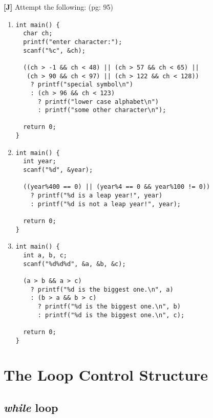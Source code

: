 \documentclass{report}
\begin{document}
\textbf{[J]} Attempt the following: (pg: 95)
\begin{enumerate}
    \renewcommand{\labelenumi}{\alph{enumi}}
  \item \begin{verbatim}
int main() {
  char ch;
  printf("enter character:");
  scanf("%c", &ch);

  ((ch > -1 && ch < 48) || (ch > 57 && ch < 65) ||
   (ch > 90 && ch < 97) || (ch > 122 && ch < 128))
    ? printf("special symbol\n")
    : (ch > 96 && ch < 123)
      ? printf("lower case alphabet\n")
      : printf("some other character\n");

  return 0;
}
  \end{verbatim}
  \item \begin{verbatim}
int main() {
  int year;
  scanf("%d", &year);

  ((year%400 == 0) || (year%4 == 0 && year%100 != 0))
    ? printf("%d is a leap year!", year)
    : printf("%d is not a leap year!", year);
  
  return 0;
}
  \end{verbatim}
  \item \begin{verbatim}
int main() {
  int a, b, c;
  scanf("%d%d%d", &a, &b, &c);

  (a > b && a > c)
    ? printf("%d is the biggest one.\n", a)
    : (b > a && b > c)
      ? printf("%d is the biggest one.\n", b)
      : printf("%d is the biggest one.\n", c);
  
  return 0;
}
  \end{verbatim}
\end{enumerate}



\chapter{The Loop Control Structure}
\section*{\textit{while} loop}
\end{document}
